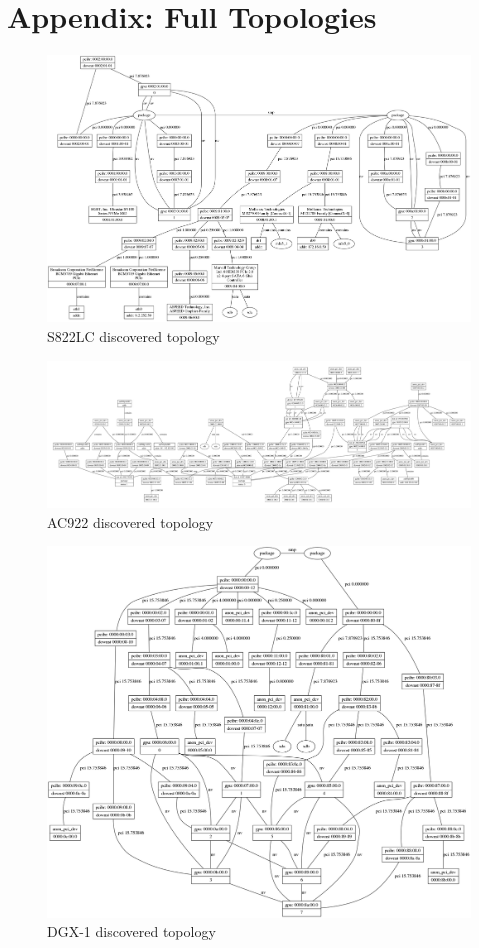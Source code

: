 \chapter{Appendix: Full Topologies}
\label{ch:full-topos}

\begin{figure}[ht]
    \centering
    \includegraphics[width=\textwidth]{figures/topo-minsky-actual.png}
    \caption{S822LC discovered topology}
    \label{fig:topo-minsky-actual}
\end{figure}

\begin{figure}[ht]
    \centering
    \includegraphics[width=\textwidth]{figures/topo-ac922-actual.pdf}
    \caption{AC922 discovered topology}
    \label{fig:topo-ac922-actual}
\end{figure}

\begin{figure}[ht]
    \centering
    \includegraphics[width=\textwidth]{figures/topo-dgx1-actual.png}
    \caption{DGX-1 discovered topology}
    \label{fig:topo-dgx-actual}
\end{figure}
